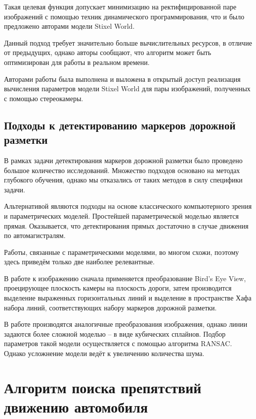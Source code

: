\documentclass[aps,%
14pt,%
final,%
oneside,
onecolumn,%
musixtex, %
superscriptaddress,%
centertags]{extarticle} %
\begin{document}
Такая целевая функция допускает минимизацию на ректифицированной паре изображений с помощью техник динамического программирования, что и было предложено авторами модели Stixel World.

Данный подход требует значительно больше вычислительных ресурсов, в отличие от предыдущих, однако авторы \cite{benenson2011stixels} сообщают, что алгоритм может быть оптимизирован для работы в реальном времени.

Авторами работы \cite{benenson2011stixels} была выполнена и выложена в открытый доступ реализация\cite{doppia_repo} вычисления параметров модели Stixel World для пары изображений, полученных с помощью стереокамеры. 


\subsection{Подходы к детектированию маркеров дорожной разметки}

В рамках задачи детектирования маркеров дорожной разметки было проведено большое количество исследований\cite{hillel2014recent}. Множество подходов основано на методах глубокого обучения, однако мы отказались от таких методов в силу специфики задачи.

Альтернативой являются подходы на основе классического компьютерного зрения и параметрических моделей. Простейшей параметрической моделью является прямая. Оказывается, что детектирования прямых достаточно в случае движения по автомагистралям\cite{hillel2014recent}.

Работы, связанные с параметрическими моделями, во многом схожи, поэтому здесь приведём только две наиболее релевантные. 

В работе \cite{song2017real} к изображению сначала применяется преобразование Bird's Eye View, проецирующее плоскость камеры на плоскость дороги, затем производится выделение выраженных горизонтальных линий и выделение в пространстве Хафа набора линий, соответствующих набору маркеров дорожной разметки.

В работе \cite{aly2008real} производятся аналогичные преобразования изображения, однако линии задаются более сложной моделью -- в виде кубических сплайнов. Подбор параметров такой модели осуществляется с помощью алгоритма RANSAC. Однако усложнение модели ведёт к увеличению количества шума.


\newpage
\section{Алгоритм поиска препятствий движению автомобиля}
\end{document}
